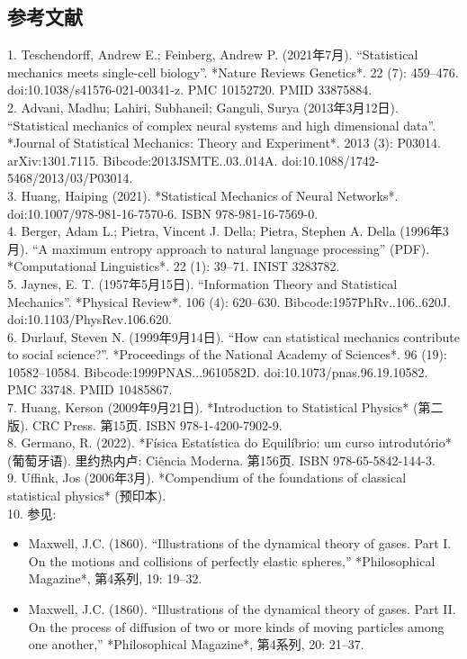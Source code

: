 \subsection{参考文献}
1. Teschendorff, Andrew E.; Feinberg, Andrew P. (2021年7月). “Statistical mechanics meets single-cell biology”. *Nature Reviews Genetics*. 22 (7): 459–476. doi:10.1038/s41576-021-00341-z. PMC 10152720. PMID 33875884.\\
2. Advani, Madhu; Lahiri, Subhaneil; Ganguli, Surya (2013年3月12日). “Statistical mechanics of complex neural systems and high dimensional data”. *Journal of Statistical Mechanics: Theory and Experiment*. 2013 (3): P03014. arXiv:1301.7115. Bibcode:2013JSMTE..03..014A. doi:10.1088/1742-5468/2013/03/P03014.\\
3. Huang, Haiping (2021). *Statistical Mechanics of Neural Networks*. doi:10.1007/978-981-16-7570-6. ISBN 978-981-16-7569-0.\\
4. Berger, Adam L.; Pietra, Vincent J. Della; Pietra, Stephen A. Della (1996年3月). “A maximum entropy approach to natural language processing” (PDF). *Computational Linguistics*. 22 (1): 39–71. INIST 3283782.\\
5. Jaynes, E. T. (1957年5月15日). “Information Theory and Statistical Mechanics”. *Physical Review*. 106 (4): 620–630. Bibcode:1957PhRv..106..620J. doi:10.1103/PhysRev.106.620.\\
6. Durlauf, Steven N. (1999年9月14日). “How can statistical mechanics contribute to social science?”. *Proceedings of the National Academy of Sciences*. 96 (19): 10582–10584. Bibcode:1999PNAS...9610582D. doi:10.1073/pnas.96.19.10582. PMC 33748. PMID 10485867.\\
7. Huang, Kerson (2009年9月21日). *Introduction to Statistical Physics* (第二版). CRC Press. 第15页. ISBN 978-1-4200-7902-9.\\
8. Germano, R. (2022). *Física Estatística do Equilíbrio: um curso introdutório* (葡萄牙语). 里约热内卢: Ciência Moderna. 第156页. ISBN 978-65-5842-144-3. \\
9. Uffink, Jos (2006年3月). *Compendium of the foundations of classical statistical physics* (预印本).\\
10. 参见:  
   \begin{itemize}
   \item Maxwell, J.C. (1860). “Illustrations of the dynamical theory of gases. Part I. On the motions and collisions of perfectly elastic spheres,” *Philosophical Magazine*, 第4系列, 19: 19–32.  
     \item Maxwell, J.C. (1860). “Illustrations of the dynamical theory of gases. Part II. On the process of diffusion of two or more kinds of moving particles among one another,” *Philosophical Magazine*, 第4系列, 20: 21–37.
   \end{itemize} \\
